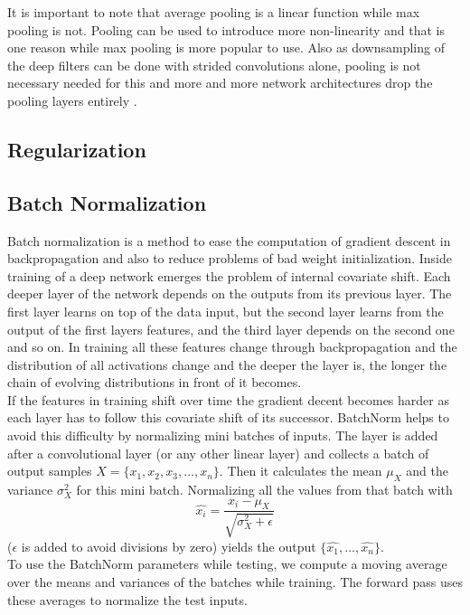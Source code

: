 It is important to note that average pooling is a linear function while max pooling is not. Pooling can be used to introduce more non-linearity and that is one reason while max pooling is more popular to use. Also as downsampling of the deep filters can be done with strided convolutions alone, pooling is not necessary needed for this and more and more network architectures drop the pooling layers entirely \citep{springenberg_striving_2014}.

\subsection{Regularization} %
\label{sub:conepts:nn:regularization}

\subsection{Batch Normalization} %
\label{sub:conepts:nn:batchnorm}
Batch normalization \citep{ioffe_batch_2015} is a method to ease the computation of gradient descent in backpropagation and also to reduce problems of bad weight initialization. Inside training of a deep network emerges the problem of internal covariate shift. Each deeper layer of the network depends on the outputs from its previous layer. The first layer learns on top of the data input, but the second layer learns from the output of the first layers features, and the third layer depends on the second one and so on. In training all these features change through backpropagation and the distribution of all activations change and the deeper the layer is, the longer the chain of evolving distributions in front of it becomes.\\
If the features in training shift over time the gradient decent becomes harder as each layer has to follow this covariate shift of its successor. BatchNorm helps to avoid this difficulty by normalizing mini batches of inputs. The layer is added after a convolutional layer (or any other linear layer) and collects a batch of output samples $X = \{x_1, x_2, x_3, \dots, x_n\}$. Then it calculates the mean $\mu_X$ and the variance $\sigma_X^2$ for this mini batch. Normalizing all the values from that batch with
\begin{equation}
    \hat{x_i} = \frac{x_i - \mu_X}{\sqrt{\sigma_X^2 + \epsilon}}
\end{equation}
($\epsilon$ is added to avoid divisions by zero) yields the output $\{\hat{x_1},\dots,\hat{x_n}\}$.\\
To use the BatchNorm parameters while testing, we compute a moving average over the means and variances of the batches while training. The forward pass uses these averages to normalize the test inputs.

